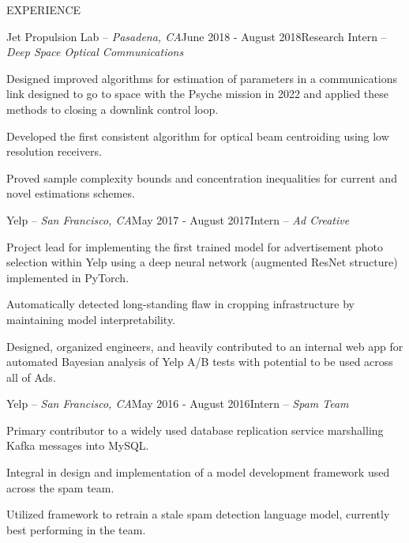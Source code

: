 \documentclass{resume} %
\begin{document}
 

\vspace{-1em}
\begin{rSection}{EXPERIENCE}

\begin{rSubsection}{Jet Propulsion Lab -- {\it Pasadena, CA}}{June 2018 - August 2018}{Research Intern -- {\sl Deep Space Optical Communications}}

\item Designed improved algorithms for estimation of parameters in a communications link designed
    to go to space with the Psyche mission in 2022 and applied these methods to closing a downlink
    control loop.
\item Developed the first consistent algorithm for optical beam centroiding using low resolution receivers.
\item Proved sample complexity bounds and concentration inequalities for current and novel estimations schemes.
\end{rSubsection}

\begin{rSubsection}{Yelp -- {\it San Francisco, CA}}{May 2017 - August 2017}{Intern -- {\sl Ad Creative}}

\item Project lead for implementing the first trained model for advertisement photo selection
    within Yelp using a deep neural network (augmented ResNet structure) implemented in PyTorch.
\item Automatically detected long-standing flaw in cropping infrastructure by maintaining model interpretability.
\item Designed, organized engineers, and heavily contributed to an internal web app for
    automated Bayesian analysis of Yelp A/B tests with potential to be used across all of Ads.
\end{rSubsection}

\begin{rSubsection}{Yelp -- {\it San Francisco, CA}}{May 2016 - August 2016}{Intern -- {\sl Spam Team}}

\item Primary contributor to a widely used database replication service marshalling Kafka messages into MySQL.
\item Integral in design and implementation of a model development framework used across the spam team.
\item Utilized framework to retrain a stale spam detection language model, currently best performing in
    the team.
\end{rSubsection}


\end{rSection}
\end{document}
